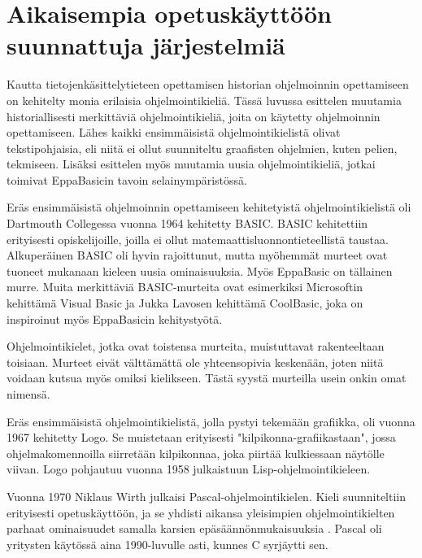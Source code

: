 
\section{Aikaisempia opetuskäyttöön suunnattuja järjestelmiä}


Kautta tietojenkäsittelytieteen
opettamisen historian ohjelmoinnin
opettamiseen on kehitelty
monia erilaisia ohjelmointikieliä.
Tässä luvussa esittelen muutamia
historiallisesti merkittäviä
ohjelmointikieliä, joita
on käytetty ohjelmoinnin opettamiseen.
Lähes kaikki ensimmäisistä
ohjelmointikielistä olivat
tekstipohjaisia, eli
niitä ei ollut suunniteltu
graafisten ohjelmien,
kuten pelien, tekmiseen.
Lisäksi esittelen myös muutamia uusia
ohjelmointikieliä, jotkai toimivat
EppaBasicin tavoin selainympäristössä.

Eräs ensimmäisistä ohjelmoinnin
opettamiseen kehitetyistä
ohjelmointikielistä oli
Dartmouth Collegessa vuonna 1964
kehitetty BASIC.
BASIC kehitettiin erityisesti
opiskelijoille, joilla ei ollut
matemaattisluonnontieteellistä
taustaa.
Alkuperäinen BASIC oli hyvin
rajoittunut, mutta myöhemmät
murteet ovat tuoneet mukanaan
kieleen uusia ominaisuuksia.
Myös EppaBasic on
tällainen murre.
Muita merkittäviä BASIC-murteita
ovat esimerkiksi
Microsoftin kehittämä
Visual Basic ja
Jukka Lavosen kehittämä
CoolBasic, joka on inspiroinut
myös EppaBasicin kehitystyötä.

Ohjelmointikielet, jotka ovat
toistensa murteita,
muistuttavat rakenteeltaan
toisiaan.
Murteet eivät välttämättä
ole yhteensopivia keskenään,
joten niitä voidaan kutsua
myös omiksi kielikseen.
Tästä syystä murteilla
usein onkin omat nimensä.

Eräs ensimmäisistä ohjelmointikielistä,
jolla pystyi tekemään grafiikka,
oli vuonna 1967 kehitetty Logo.
Se muistetaan erityisesti
"kilpikonna-grafiikastaan",
jossa ohjelmakomennoilla
siirretään kilpikonnaa,
joka piirtää kulkiessaan
näytölle viivan.
Logo pohjautuu vuonna 1958
julkaistuun Lisp-ohjelmointikieleen.

Vuonna 1970 Niklaus Wirth
julkaisi Pascal-ohjelmointikielen.
Kieli suunniteltiin erityisesti
opetuskäyttöön, ja se yhdisti
aikansa yleisimpien ohjelmointikielten
parhaat ominaisuudet samalla
karsien epäsäännönmukaisuuksia
\cite{language_history}.
Pascal oli yritysten käytössä aina
1990-luvulle asti, kunnes C
syrjäytti sen.


